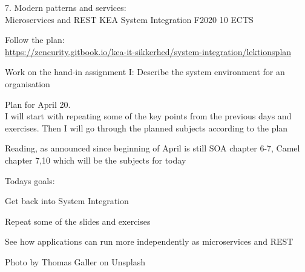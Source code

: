 \documentclass[Screen16to9,17pt]{foils}
\begin{document}
\mytitlepage
{7. Modern patterns and services:\\ Microservices and REST}
{KEA System Integration F2020 10 ECTS}


\begin{list2}
\item Follow the plan:\\
\url{https://zencurity.gitbook.io/kea-it-sikkerhed/system-integration/lektionsplan}
\item Work on the hand-in assignment I: Describe the system environment for an organisation
\item Plan for April 20.\\
I will start with repeating some of the key points from the previous days and exercises.
Then I will go through the planned subjects according to the plan
\item Reading, as announced since beginning of April is still
SOA chapter 6-7, Camel chapter 7,10 which will be the subjects for today
\end{list2}



Todays goals:
\begin{list2}
\item Get back into System Integration
\item Repeat some of the slides and exercises
\item See how applications can run more independently as microservices and REST
\end{list2}

Photo by Thomas Galler on Unsplash
\end{document}
